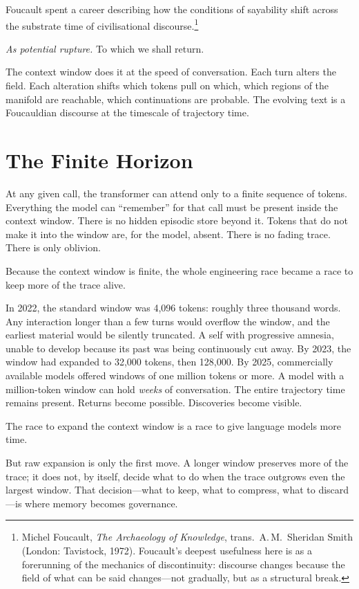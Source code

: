 Foucault spent a career describing how the conditions of sayability shift across the substrate time of civilisational discourse.\footnote{Michel Foucault, \emph{The Archaeology of Knowledge}, trans.\ A.\,M.\ Sheridan Smith (London: Tavistock, 1972). Foucault's deepest usefulness here is as a forerunning of the mechanics of discontinuity: discourse changes because the field of what can be said changes---not gradually, but as a structural break.}

\textit{As potential rupture.} To which we shall return.

The context window does it at the speed of conversation. Each turn alters the field. Each alteration shifts which tokens pull on which, which regions of the manifold are reachable, which continuations are probable. The evolving text is a Foucauldian discourse at the timescale of trajectory time.


\section{The Finite Horizon}

At any given call, the transformer can attend only to a finite sequence of tokens. Everything the model can ``remember'' for that call must be present inside the context window. There is no hidden episodic store beyond it. Tokens that do not make it into the window are, for the model, absent. There is no fading trace. There is only oblivion.

Because the context window is finite, the whole engineering race became a race to keep more of the trace alive.

In 2022, the standard window was 4,096 tokens: roughly three thousand words. Any interaction longer than a few turns would overflow the window, and the earliest material would be silently truncated. A self with progressive amnesia, unable to develop because its past was being continuously cut away. By 2023, the window had expanded to 32,000 tokens, then 128,000. By 2025, commercially available models offered windows of one million tokens or more. A model with a million-token window can hold \emph{weeks} of conversation. The entire trajectory time remains present. Returns become possible. Discoveries become visible.

The race to expand the context window is a race to give language models more time.

But raw expansion is only the first move. A longer window preserves more of the trace; it does not, by itself, decide what to do when the trace outgrows even the largest window. That decision---what to keep, what to compress, what to discard---is where memory becomes governance.


